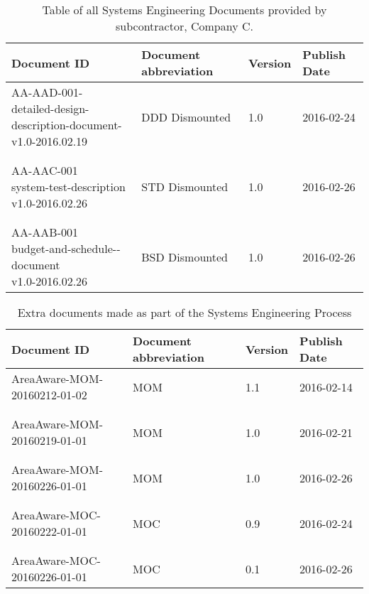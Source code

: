 \begin{table}[h]
    \centering
    \label{tab:baseline3}
    \begin{tabular}{llll}
    \textbf{Document ID} & \textbf{Document abbreviation} & \textbf{Version} & \textbf{Publish Date} \\ \hline
    \makecell[l]{AA-AAD-001-\\detailed-design-description-document-\\v1.0-2016.02.19} & DDD Dismounted & 1.0 & 2016-02-24 \\ \hline
    &  &  &  \\
    &  &  &  \\
    \makecell[l]{AA­-AAC-­001­\\system­-test-­description­\\v1.0­-2016.02.26} & STD Dismounted & 1.0 & 2016-02-26 \\ \hline
    &  &  &  \\
    &  &  &  \\
    \makecell[l]{AA­-AAB-­001­\\budget­-and­-schedule-­document­\\v1.0­-2016.02.26} & BSD Dismounted & 1.0 & 2016-02-26 \\ \hline
    \end{tabular}
    \caption{Table of all Systems Engineering Documents provided by subcontractor, Company C.}
\end{table}


\begin{table}[h]
    \centering
    \begin{tabular}{llll}
    \textbf{Document ID} & \textbf{Document abbreviation} & \textbf{Version} & \textbf{Publish Date} \\ \hline
    AreaAware-MOM-20160212-01-02 & MOM & 1.1 & 2016-02-14 \\ \hline
    &  &  &  \\
    &  &  &  \\
    AreaAware-MOM-20160219-01-01 & MOM & 1.0 & 2016-02-21 \\ \hline
    &  &  &  \\
    &  &  &  \\
    AreaAware-MOM-20160226-01-01 & MOM & 1.0 & 2016-02-26 \\ \hline
    &  &  &  \\
    &  &  &  \\
    AreaAware-MOC-20160222-01-01 & MOC & 0.9 & 2016-02-24\\ \hline
    &  &  &  \\
    &  &  &  \\
    AreaAware-MOC-20160226-01-01 & MOC & 0.1 & 2016-02-26 \\ \hline
    \end{tabular}
    \caption{Extra documents made as part of the Systems Engineering Process}
    \label{tab:extra}
\end{table}

